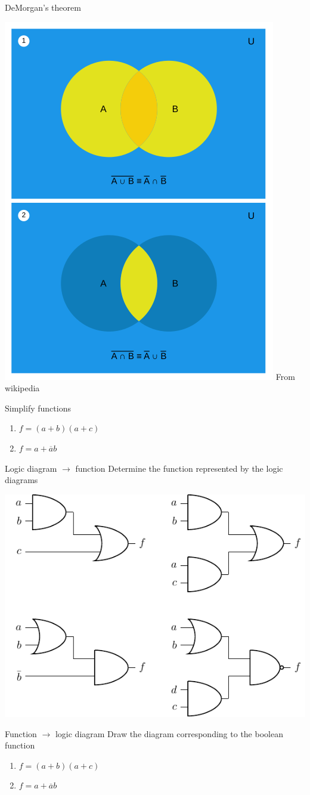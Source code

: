 \documentclass[presentation,aspectratio=1610]{beamer}
\renewcommand*{\not}[1]{\ensuremath{\bar{#1}}}
\renewcommand*{\not}[1]{\ensuremath{\overline{#1}}}
\begin{document}
\begin{frame}[label={sec:orgd14be63}]{DeMorgan's theorem}
\begin{center}
\includegraphics[width=0.4\linewidth]{../../figures/Demorganlaws.png} From wikipedia
\end{center}
\end{frame}
\begin{frame}[label={sec:orgbb8fe29}]{Simplify functions}
\begin{enumerate}
\item \(f = (a+b)(a+c)\)
\item \(f = a + \not{a}b\)
\end{enumerate}
\end{frame}


\begin{frame}[label={sec:orgd9a80c9}]{Logic diagram \(\rightarrow\) function}
Determine the function represented by the logic diagrams
\begin{center}
\includegraphics[width=0.7\linewidth]{../../figures/exercise-gate-4.pdf}
\end{center}
\end{frame}


\begin{frame}[label={sec:org42b2888}]{Function \(\rightarrow\) logic diagram}
Draw the diagram corresponding to the boolean function
\begin{enumerate}
\item \(f = (a+b)(a+c)\)
\item \(f = a + \not{a}b\)
\end{enumerate}
\end{frame}
\end{document}
